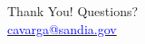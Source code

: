 
\begin{frame}
    \footnotesize
    \vspace*{1.3in}
    \begin{center}
    \Large
    Thank You! Questions?\\
    \underline{\textcolor{blue}{cavarga@sandia.gov}}
    \end{center}
\end{frame}